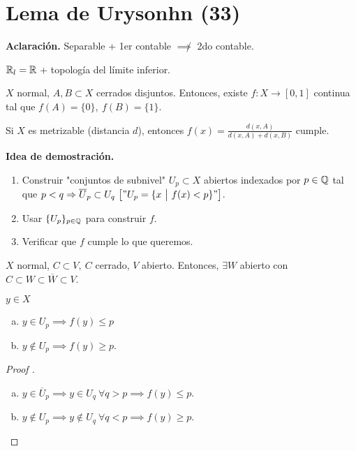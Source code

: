 
\section{Lema de Urysonhn (33)}

\textbf{Aclaración.} Separable + 1er contable $\not\implies$ 2do contable.

\begin{eg}
	$\R_{l} = \R$ + topología del límite inferior.
\end{eg}

\begin{lemma}[de Urysonhn]
	$X$ normal, $A,B \subset X$ cerrados disjuntos. Entonces, existe $f : X \to [0,1]$ continua tal que $f(A) = \{0\},\ f(B) = \{1\}$.  
\end{lemma}

\begin{remark}
	Si $X$ es metrizable (distancia $d$), entonces $f(x) = \frac{d(x,A)}{d(x,A) + d(x,B)}$ cumple.
\end{remark}

\noindent \textbf{Idea de demostración.} 

\begin{enumerate}
	\item Construir "conjuntos de subnivel" $U_{p} \subset X$ abiertos indexados por $p \in \Q$ tal que $p < q \implies \overline{U}_{p} \subset U_{q} \ \big[ "U_{p} = \{x \ \big| \ f(x) < p\}" \big]$.

	\item Usar $\{U_{p}\}_{p \in \Q}$ para construir $f$.

	\item Verificar que $f$ cumple lo que queremos.
\end{enumerate}

\begin{lemma}
	$X$ normal, $C \subset V, \ C$ cerrado, $V$ abierto. Entonces, $\exists W$ abierto con $C \subset W \subset \overline{W} \subset V$.
\end{lemma}

\begin{lemma}
	$y \in X$
	\begin{enumerate}[a)]
		\item $y \in U_{p} \implies f(y) \leq p$

		\item $y \not\in U_{p} \implies f(y) \geq p$.
	\end{enumerate}
\end{lemma}
\begin{proof}[Proof ]
	\begin{enumerate}[a)]
		\item $y \in \overline{U}_{p} \implies y \in U_{q} \ \forall q > p \implies f(y) \leq p$.

		\item $y \not\in U_{p} \implies y \not\in U_{q} \ \forall q < p \implies f(y) \geq p$.
	\end{enumerate}
\end{proof}

